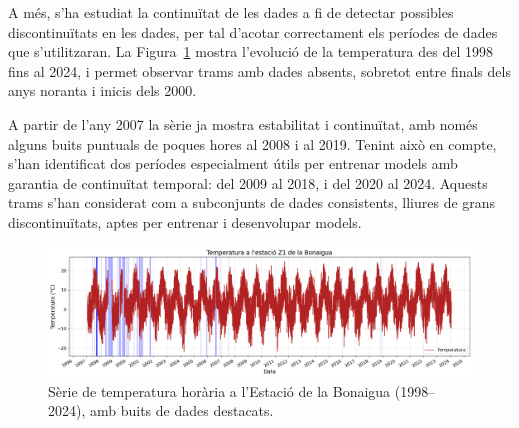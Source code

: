 \documentclass[../main.tex]{subfiles}
\begin{document}
A més, s’ha estudiat la continuïtat de les dades a fi de detectar possibles discontinuïtats en les dades, per tal d'acotar correctament els períodes de dades que s'utilitzaran. La Figura~\ref{fig:Serie_com_disc} mostra l’evolució de la temperatura des del 1998 fins al 2024, i permet observar trams amb dades absents, sobretot entre finals dels anys noranta i inicis dels 2000.

A partir de l’any 2007 la sèrie ja mostra estabilitat i continuïtat, amb només alguns buits puntuals de poques hores al 2008 i al 2019. Tenint això en compte, s’han identificat dos períodes especialment útils per entrenar models amb garantia de continuïtat temporal: del 2009 al 2018, i del 2020 al 2024. Aquests trams s’han considerat com a subconjunts de dades consistents, lliures de grans discontinuïtats, aptes per entrenar i desenvolupar models.

\begin{figure}[H]
    \centering
    \includegraphics[width=0.75\linewidth]{figures/data_preproces/data_continuitat.png}
    \caption{Sèrie de temperatura horària a l'Estació de la Bonaigua (1998–2024), amb buits de dades destacats.}

    \label{fig:Serie_com_disc}
\end{figure}

\end{document}

